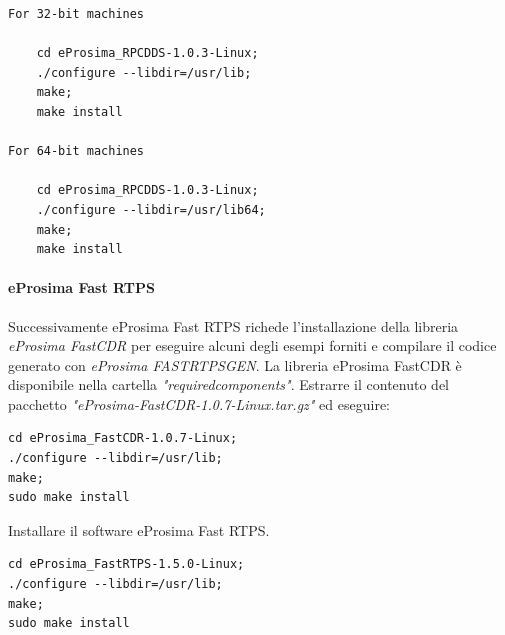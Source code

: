 \documentclass[a4paper]{article}
\begin{document}
\begin{verbatim}
For 32-bit machines

    cd eProsima_RPCDDS-1.0.3-Linux;
    ./configure --libdir=/usr/lib;
    make;
    make install

For 64-bit machines

    cd eProsima_RPCDDS-1.0.3-Linux;
    ./configure --libdir=/usr/lib64;
    make;
    make install
\end{verbatim}

\paragraph{eProsima Fast RTPS}
Successivamente eProsima Fast RTPS richede l'installazione della libreria \textit{eProsima FastCDR} per eseguire alcuni degli esempi forniti e compilare il codice generato con \textit{eProsima FASTRTPSGEN}.
La libreria eProsima FastCDR è disponibile nella cartella \textit{"requiredcomponents"}. Estrarre il contenuto del pacchetto \textit{"eProsima-FastCDR-1.0.7-Linux.tar.gz"} ed eseguire:
\begin{verbatim}
cd eProsima_FastCDR-1.0.7-Linux;
./configure --libdir=/usr/lib;
make;
sudo make install
\end{verbatim}
Installare il software eProsima Fast RTPS.
\begin{verbatim}
cd eProsima_FastRTPS-1.5.0-Linux;
./configure --libdir=/usr/lib;
make;
sudo make install

\end{verbatim}
\end{document}

